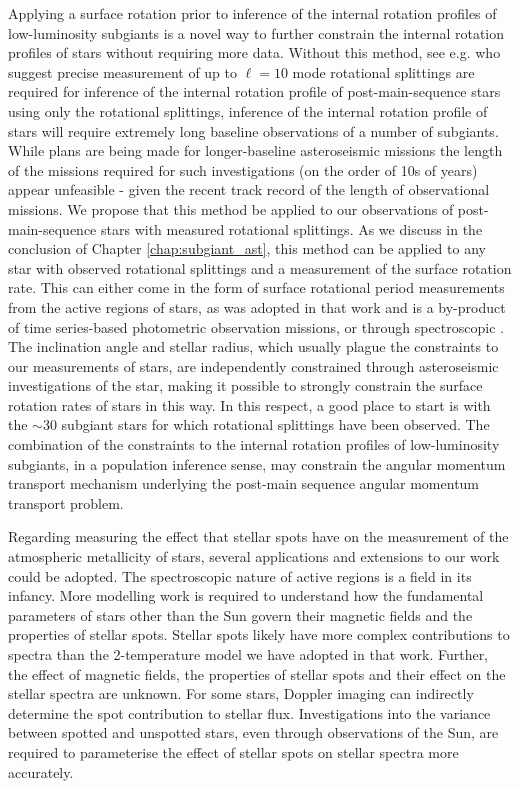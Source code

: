 Applying a surface rotation prior to inference of the internal rotation profiles of low-luminosity subgiants is a novel way to further constrain the internal rotation profiles of stars without requiring more data.
Without this method, see e.g. \citet{ahlborn_asteroseismic_2020} who suggest precise measurement of up to $\ell = 10$ mode rotational splittings are required for inference of the internal rotation profile of post-main-sequence stars using only the rotational splittings, inference of the internal rotation profile of stars will require extremely long baseline observations of a number of subgiants.
While plans are being made for longer-baseline asteroseismic missions \citep{rauer_plato_2014, akeson_wide_2019, miglio_haydn_2021} the length of the missions required for such investigations (on the order of 10s of years) appear unfeasible - given the recent track record of the length of observational missions.
We propose that this method be applied to our observations of post-main-sequence stars with measured rotational splittings.
As we discuss in the conclusion of Chapter \ref{chap:subgiant_ast}, this method can be applied to any star with observed rotational splittings and a measurement of the surface rotation rate.
This can either come in the form of surface rotational period measurements from the active regions of stars, as was adopted in that work and is a by-product of time series-based photometric observation missions, or through spectroscopic \vsini.
The inclination angle and stellar radius, which usually plague the constraints to our measurements of stars, are independently constrained through asteroseismic investigations of the star, making it possible to strongly constrain the surface rotation rates of stars in this way.
In this respect, a good place to start is with the $\sim$30 subgiant stars for which rotational splittings have been observed.
The combination of the constraints to the internal rotation profiles of low-luminosity subgiants, in a population inference sense, may constrain the angular momentum transport mechanism underlying the post-main sequence angular momentum transport problem.

Regarding measuring the effect that stellar spots have on the measurement of the atmospheric metallicity of stars, several applications and extensions to our work could be adopted.
The spectroscopic nature of active regions is a field in its infancy.
More modelling work is required to understand how the fundamental parameters of stars other than the Sun govern their magnetic fields and the properties of stellar spots.
Stellar spots likely have more complex contributions to spectra than the 2-temperature model we have adopted in that work.
Further, the effect of magnetic fields, the properties of stellar spots and their effect on the stellar spectra are unknown.
For some stars, Doppler imaging can indirectly determine the spot contribution to stellar flux.
Investigations into the variance between spotted and unspotted stars, even through observations of the Sun, are required to parameterise the effect of stellar spots on stellar spectra more accurately.

